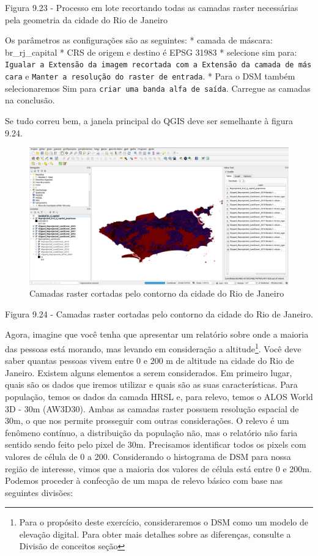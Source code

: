 \documentclass[
]{book}
\begin{document}
Figura 9.23 - Processo em lote recortando todas as camadas raster necessárias pela geometria da cidade do Rio de Janeiro

Os parâmetros as configurações são as seguintes:
* camada de máscara: br\_rj\_capital
* CRS de origem e destino é EPSG 31983
* selecione sim para: \texttt{Igualar\ a\ Extensão\ da\ imagem\ recortada\ com\ a\ Extensão\ da\ camada\ de\ máscara} e \texttt{Manter\ a\ resolução\ do\ raster\ de\ entrada}.
* Para o DSM também selecionaremos Sim para \texttt{criar\ uma\ banda\ alfa\ de\ saída}. Carregue as camadas na conclusão.

Se tudo correu bem, a janela principal do QGIS deve ser semelhante à figura 9.24.

\begin{figure}
\centering
\includegraphics{media/modulo9/fig924.png}
\caption{Camadas raster cortadas pelo contorno da cidade do Rio de Janeiro}
\end{figure}

Figura 9.24 - Camadas raster cortadas pelo contorno da cidade do Rio de Janeiro.

Agora, imagine que você tenha que apresentar um relatório sobre onde a maioria das pessoas está morando, mas levando em consideração a altitude\footnote{Para o propósito deste exercício, consideraremos o DSM como um modelo de elevação digital. Para obter mais detalhes sobre as diferenças, consulte a Divisão de conceitos seção}. Você deve saber quantas pessoas vivem entre 0 e 200 m de altitude na cidade do Rio de Janeiro. Existem alguns elementos a serem considerados. Em primeiro lugar, quais são os dados que iremos utilizar e quais são as suas características. Para população, temos os dados da camada HRSL e, para relevo, temos o ALOS World 3D - 30m (AW3D30). Ambas as camadas raster possuem resolução espacial de 30m, o que nos permite prosseguir com outras considerações. O relevo é um fenômeno contínuo, a distribuição da população não, mas o relatório não faria sentido sendo feito pelo pixel de 30m. Precisamos identificar todos os pixels com valores de célula de 0 a 200. Considerando o histograma de DSM para nossa região de interesse, vimos que a maioria dos valores de célula está entre 0 e 200m. Podemos proceder à confecção de um mapa de relevo básico com base nas seguintes divisões:
\end{document}
